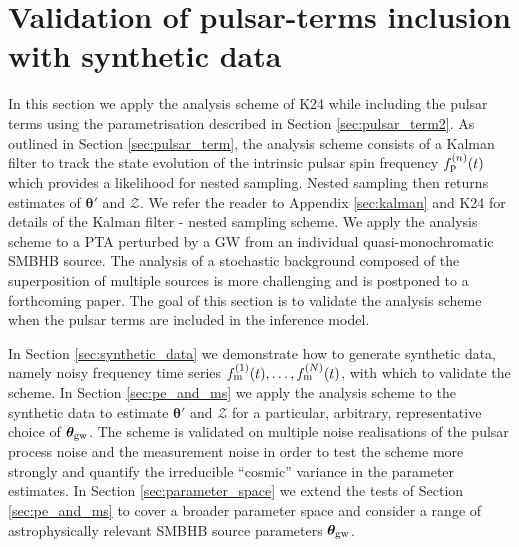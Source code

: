 \documentclass[fleqn,usenatbib,useAMS]{mnras}
\begin{document}
\section{Validation of pulsar-terms inclusion with synthetic data}\label{sec:rep_example1}
In this section we apply the analysis scheme of K24 while including the pulsar terms using the parametrisation described in Section \ref{sec:pulsar_term2}. As outlined in Section \ref{sec:pulsar_term}, the analysis scheme consists of a Kalman filter to track the state evolution of the intrinsic pulsar spin frequency $f_{\rm p}^{(n)}(t)$ which provides a likelihood for nested sampling. Nested sampling then returns estimates of $\boldsymbol{\theta'}$ and $\mathcal{Z}$. We refer the reader to Appendix \ref{sec:kalman} and K24 for details of the Kalman filter - nested sampling scheme. We apply the analysis scheme to a PTA perturbed by a GW from an individual quasi-monochromatic SMBHB source. The analysis of a stochastic background composed of the superposition of multiple sources is more challenging and is postponed to a forthcoming paper. The goal of this section is to validate the analysis scheme when the pulsar terms are included in the inference model. \newline 


In Section \ref{sec:synthetic_data} we demonstrate how to generate synthetic data, namely noisy frequency time series $f_{\rm m}^{(1)}(t), \dots, f_{\rm m}^{(N)}(t)$, with which to validate the scheme. In Section \ref{sec:pe_and_ms} we apply the analysis scheme to the synthetic data to estimate $\boldsymbol{\theta'}$ and $\mathcal{Z}$ for a  particular, arbitrary, representative choice of $\boldsymbol{\theta}_{\rm gw}$. The scheme is validated on multiple noise realisations of the pulsar process noise and the measurement noise in order to test the scheme more strongly and quantify the  irreducible ``cosmic'' variance in the parameter estimates. In Section \ref{sec:parameter_space} we extend the tests of Section  \ref{sec:pe_and_ms}
to cover a broader parameter space and consider a range of astrophysically relevant SMBHB source parameters $\boldsymbol{\theta}_{\rm gw}$. 
\end{document}
